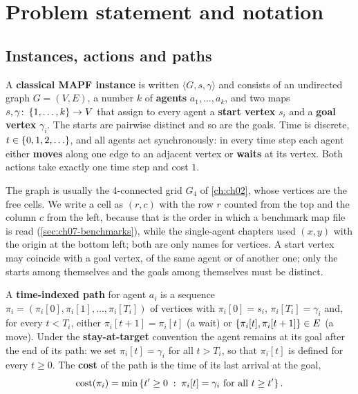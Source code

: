 \section{Problem statement and notation}
\label{sec:ch07-problem}

\subsection{Instances, actions and paths}

\begin{definition}
\label{def:ch07-instance}
A \textbf{classical MAPF instance}
is written $\langle G, s, \gamma \rangle$ and consists of an undirected graph
$G = (V, E)$, a number $k$ of \textbf{agents} $a_1, \dots, a_k$,
and two maps
$s, \gamma \colon \left\{ 1,\dots,k \right\} \to V$ that assign to every agent a
\textbf{start vertex} $s_i$ and a \textbf{goal vertex} $\gamma_i$. The starts are
pairwise distinct and so are the goals. Time is discrete,
$t \in \set{0, 1, 2, \dots}$, and all agents act synchronously: in every time
step each agent either \textbf{moves} along one edge to an
adjacent vertex or \textbf{waits} at its vertex. Both
actions take exactly one time step and cost $1$.
\end{definition}

The graph is usually the 4-connected grid $G_4$ of \cref{ch:ch02}, whose
vertices are the free cells. We write a cell as $(r, c)$ with the row $r$
counted from the top and the column $c$ from the left, because that is the
order in which a benchmark map file is read (\cref{sec:ch07-benchmarks}),
while the single-agent chapters used $(x, y)$ with the origin at the bottom
left; both are only names for vertices. A start vertex may coincide with a
goal vertex, of the same agent or of another one; only the starts among
themselves and the goals among themselves must be distinct.

\begin{definition}
\label{def:ch07-path}
A \textbf{time-indexed path} for agent $a_i$ is a
sequence $\pi_i = (\pi_i[0], \pi_i[1], \dots, \pi_i[T_i])$ of vertices with
$\pi_i[0] = s_i$, $\pi_i[T_i] = \gamma_i$ and, for every $t < T_i$, either
$\pi_i[t+1] = \pi_i[t]$ (a wait) or $\left\{ \pi_i[t], \pi_i[t+1] \right\} \in E$ (a
move). Under the \textbf{stay-at-target} convention the
agent remains at its goal after the end of its path: we set
$\pi_i[t] = \gamma_i$ for all $t > T_i$, so that $\pi_i[t]$ is defined for every
$t \ge 0$. The \textbf{cost} of the path is the time
of its last arrival at the goal,
\begin{equation}
  \operatorname{cost}(\pi_i) = \min \left\{  t' \ge 0 \;:\; \pi_i[t] = \gamma_i \text{ for all } t \ge t'  \right\}.
  \label{eq:ch07-path-cost}
\end{equation}
\end{definition}

